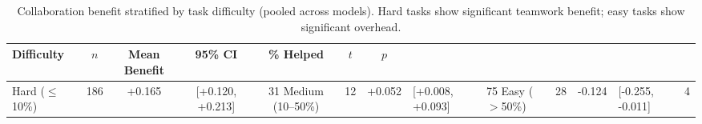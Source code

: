 \begin{table}[t]
\centering
\caption{Collaboration benefit stratified by task difficulty (pooled across models). Hard tasks show significant teamwork benefit; easy tasks show significant overhead.}
\label{tab:difficulty_stratified}
\begin{tabular}{lcccccc}
\toprule
Difficulty & $n$ & Mean Benefit & 95\% CI & \% Helped & $t$ & $p$ \\
\midrule
  Hard ($\leq$10\%) & 186 & +0.165 & [+0.120, +0.213] & 31%
  Medium (10--50\%) & 12 & +0.052 & [+0.008, +0.093] & 75%
  Easy ($>$50\%) & 28 & -0.124 & [-0.255, -0.011] & 4%
\bottomrule
\end{tabular}
\end{table}